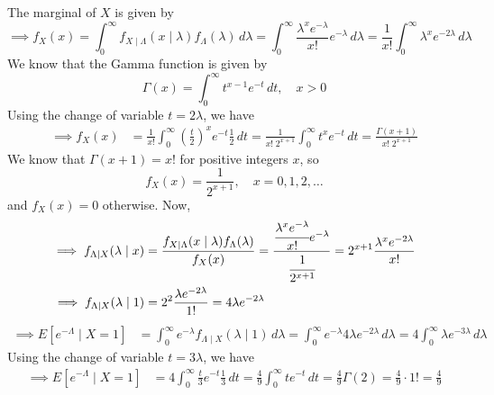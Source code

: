 The marginal of \( X \) is given by
\begin{equation*}
    \implies
    f_{X}(x)
    =
    \int_{0}^{\infty} f_{X \mid \Lambda}(x \mid \lambda) f_{\Lambda}(\lambda) \, d\lambda
    =
    \int_{0}^{\infty} \frac{\lambda^{x} e^{-\lambda}}{x!} e^{-\lambda} \, d\lambda
    =
    \frac{1}{x!} \int_{0}^{\infty} \lambda^{x} e^{-2\lambda} \, d\lambda
\end{equation*}
We know that the Gamma function is given by
\begin{equation*}
    \Gamma(x)
    =
    \int_{0}^{\infty} t^{x-1} e^{-t} \, dt,
    \quad x>0
\end{equation*}
Using the change of variable \( t=2\lambda \), we have
\begin{align*}
    \implies
    f_{X}(x)
     & =
    \frac{1}{x!} \int_{0}^{\infty} {\left(\frac{t}{2}\right)}^{x} e^{-t} \frac{1}{2} \, dt
    =
    \frac{1}{x! \; 2^{x+1}} \int_{0}^{\infty} t^{x} e^{-t} \, dt
    =
    \frac{\Gamma(x+1)}{x! \; 2^{x+1}}
\end{align*}
We know that \( \Gamma(x+1)=x! \) for positive integers \( x \), so
\begin{equation}
    f_{X}(x)
    =
    \frac{1}{2^{x+1}},
    \quad
    x=0,1,2, \dots
\end{equation}
and \( f_{X}(x)=0 \) otherwise.
Now,
\vspace*{-1em}
\begin{align*}
    \implies
    f_{\Lambda \mid X}(\lambda \mid x)
     & =
    \frac{f_{X \mid \Lambda}(x \mid \lambda) f_{\Lambda}(\lambda)}{f_{X}(x)}
    =
    \frac{\cfrac{\lambda^{x} e^{-\lambda}}{x!} e^{-\lambda}}{\cfrac{1}{2^{x+1}}}
    =
    2^{x+1} \frac{\lambda^{x} e^{-2\lambda}}{x!}
    \\
    \implies
    f_{\Lambda \mid X}(\lambda \mid 1)
     & =
    2^{2} \frac{\lambda e^{-2\lambda}}{1!}
    =
    4 \lambda e^{-2\lambda}
\end{align*}
\begin{align*}
    \implies
    E\left[e^{-\Lambda} \mid X=1\right]
     & =
    \int_{0}^{\infty} e^{-\lambda} f_{\Lambda \mid X}(\lambda \mid 1) \, d\lambda
    =
    \int_{0}^{\infty} e^{-\lambda} 4 \lambda e^{-2\lambda} \, d\lambda
    =
    4 \int_{0}^{\infty} \lambda e^{-3\lambda} \, d\lambda
\end{align*}
Using the change of variable \( t=3\lambda \), we have
\begin{align*}
    \implies
    E\left[e^{-\Lambda} \mid X=1\right]
     & =
    4 \int_{0}^{\infty} \frac{t}{3} e^{-t} \frac{1}{3} \, dt
    =
    \frac{4}{9} \int_{0}^{\infty} t e^{-t} \, dt
    =
    \frac{4}{9} \Gamma(2)
    =
    \frac{4}{9} \cdot 1!
    =
    \boxed{
        \frac{4}{9}
    }
\end{align*}
